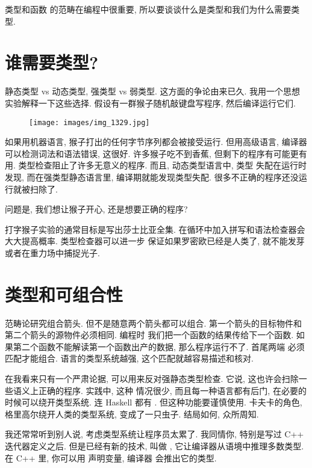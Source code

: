 
\lettrine[lhang=0.17]{类型}{和函数} 的范畴在编程中很重要, 所以要谈谈什么是类型和我们为什么需要类型.

\section{谁需要类型?}

静态类型 vs 动态类型, 强类型 vs 弱类型. 这方面的争论由来已久. 我用一个思想实验解释一下这些选择.
假设有一群猴子随机敲键盘写程序, 然后编译运行它们.

\begin{figure}[H]
  \centering
  \texttt{[image: images/img\_1329.jpg]}
\end{figure}

\noindent
如果用机器语言, 猴子打出的任何字节序列都会被接受运行. 但用高级语言, 编译器可以检测词法和语法错误, 这很好.
许多猴子吃不到香蕉, 但剩下的程序有可能更有用. 类型检查阻止了许多无意义的程序. 而且, 动态类型语言中, 类型
失配在运行时发现, 而在强类型静态语言里, 编译期就能发现类型失配. 很多不正确的程序还没运行就被扫除了.

问题是, 我们想让猴子开心, 还是想要正确的程序?

打字猴子实验的通常目标是写出莎士比亚全集. 在循环中加入拼写和语法检查器会大大提高概率. 类型检查器可以进一步
保证如果罗密欧已经是人类了, 就不能发芽或者在重力场中捕捉光子.

\section{类型和可组合性}

范畴论研究组合箭头. 但不是随意两个箭头都可以组合. 第一个箭头的目标物件和第二个箭头的源物件必须相同. 编程时
我们把一个函数的结果传给下一个函数. 如果第二个函数不能解读第一个函数出产的数据, 那么程序运行不了. 首尾两端
必须匹配才能组合. 语言的类型系统越强, 这个匹配就越容易描述和核对.

在我看来只有一个严肃论据, 可以用来反对强静态类型检查. 它说, 这也许会扫除一些语义上正确的程序. 实践中, 这种
情况很少, 而且每一种语言都有后门, 在必要的时候可以绕开类型系统. 连 Haskell 都有 .
但这种功能要谨慎使用. 卡夫卡的角色, 格里高尔绕开人类的类型系统, 变成了一只虫子. 结局如何, 众所周知.

我还常常听到别人说, 考虑类型系统让程序员太累了. 我同情你, 特别是写过 C++ 迭代器定义之后. 但是已经有新的技术,
叫做 , 它让编译器从语境中推理多数类型. 在 C++ 里, 你可以用  声明变量, 编译器
会推出它的类型.

